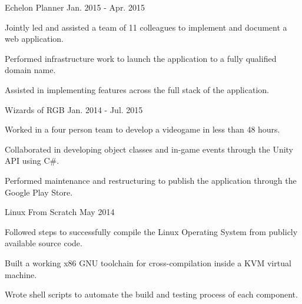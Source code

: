 \begin{cventries}
  \cventry
    {Echelon Planner} %
    {} %
    {} %
    {Jan. 2015 - Apr. 2015} %
    {
      \begin{cvitems} %
        \item {Jointly led and assisted a team of 11 colleagues to implement and document a web application.}
        \item {Performed infrastructure work to launch the application to a fully qualified domain name.}
        \item {Assisted in implementing features across the full stack of the application.}
        \\
      \end{cvitems}
    } 

  \cventry
    {Wizards of RGB} %
    {} %
    {} %
    {Jan. 2014 - Jul. 2015} %
    {
      \begin{cvitems} %
        \item {Worked in a four person team to develop a videogame in less than 48 hours.}
        \item {Collaborated in developing object classes and in-game events through the Unity API using C\#.}
        \item {Performed maintenance and restructuring to publish the application through the Google Play Store.}
        \\
      \end{cvitems}
    } 
    

  \cventry
    {Linux From Scratch} %
    {} %
    {} %
    {May 2014} %
    {
      \begin{cvitems} %
        \item {Followed steps to successfully compile the Linux Operating System from publicly available source code.}
        \item {Built a working x86 GNU toolchain for cross-compilation inside a KVM virtual machine.}
        \item {Wrote shell scripts to automate the build and testing process of each component.}
        \\
      \end{cvitems}
    } 

\end{cventries}
